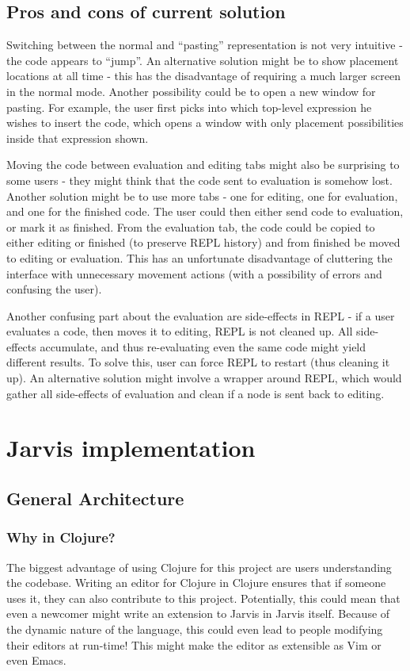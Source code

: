 \documentclass[11pt]{scrartcl}
\begin{document}
\subsection{Pros and cons of current solution}
Switching between the normal and “pasting” representation is not very intuitive
- the code appears to “jump”.
An alternative solution might be to show placement locations at all time - this
has the disadvantage of requiring a much larger screen in the normal mode.
Another possibility could be to open a new window for pasting.
For example, the user first picks into which top-level expression he wishes to
insert the code, which opens a window with only placement possibilities inside
that expression shown.

Moving the code between evaluation and editing tabs might also be surprising to
some users - they might think that the code sent to evaluation is somehow lost.
Another solution might be to use more tabs - one for editing, one for
evaluation, and one for the finished code.
The user could then either send code to evaluation, or mark it as finished.
From the evaluation tab, the code could be copied to either editing or finished
(to preserve REPL history) and from finished be moved to editing or evaluation.
This has an unfortunate disadvantage of cluttering the interface with
unnecessary movement actions (with a possibility of errors and confusing the
user).

Another confusing part about the evaluation are side-effects in REPL - if a user
evaluates a code, then moves it to editing, REPL is not cleaned up.
All side-effects accumulate, and thus re-evaluating even the same code might
yield different results.
To solve this, user can force REPL to restart (thus cleaning it up).
An alternative solution might involve a wrapper around REPL, which would gather
all side-effects of evaluation and clean if a node is sent back to editing.


\section{Jarvis implementation}
\subsection{General Architecture}
\subsubsection{Why in Clojure?}
The biggest advantage of using Clojure for this project are users understanding
the codebase.
Writing an editor for Clojure in Clojure ensures that if someone uses it, they
can also contribute to this project.
Potentially, this could mean that even a newcomer might write an extension to
Jarvis in Jarvis itself.
Because of the dynamic nature of the language, this could even lead to people
modifying their editors at run-time! This might make the editor as extensible as
Vim or even Emacs.
\end{document}
